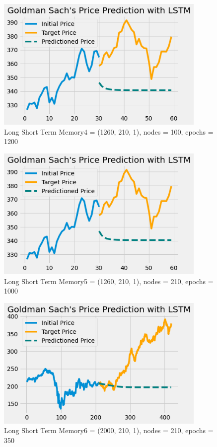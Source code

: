 \documentclass[12pt]{article}
\begin{document}
\begin{itemize}
\begin{figure}[H]
  \centering
  \includegraphics[width=0.9\textwidth]{figures/lstm4.png}
  \caption{Long Short Term Memory4 = (1260, 210, 1), nodes = 100, epochs = 1200}\label{lstm4}
\end{figure}

\begin{figure}[H]
  \centering
  \includegraphics[width=0.9\textwidth]{figures/lstm5.png}
  \caption{Long Short Term Memory5 = (1260, 210, 1), nodes = 210, epochs = 1000}\label{lstm5}
\end{figure}

\begin{figure}[H]
  \centering
  \includegraphics[width=0.9\textwidth]{figures/lstm6.png}
  \caption{Long Short Term Memory6 = (2000, 210, 1), nodes = 210, epochs = 350}\label{lstm6}
\end{figure}




\end{itemize}
\end{document}
